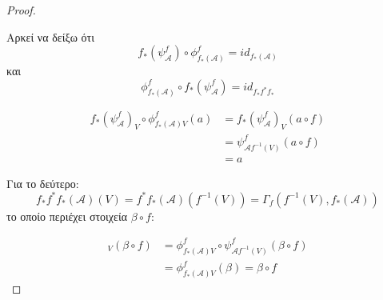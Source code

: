 \begin{proof}

    \begin{figure}[H]
        \centering
    \end{figure}
    \noindent Αρκεί να δείξω ότι $$f_*(\psi^f_{\mathcal{A}}) \circ \phi^f_{f_*(\mathcal{A})} = id_{f_*(\mathcal{A})}$$ και 
    $$\phi^f_{f_*(\mathcal{A})} \circ f_*(\psi^f_{\mathcal{A}}) = id_{f_*f^*f_*}$$


    \begin{align*}
        f_*(\psi^f_{\mathcal{A}})_V \circ \phi^f_{f_*(\mathcal{A})V}(a) & =  f_*(\psi^f_{\mathcal{A}})_V (a\circ f) \\
        &= \psi^f_{\mathcal{A}f^{-1}(V)}(a\circ f) \\
        &= a 
    \end{align*}

    \noindent Για το δεύτερο:
    $$f_*f^*f_*(\mathcal{A})(V) = f^*f_*(\mathcal{A})(f^{-1}(V)) = \Gamma_f(f^{-1}(V),f_*(\mathcal{A}))$$ το οποίο περιέχει στοιχεία $\beta \circ f$:

    \begin{align*}
        [\phi^f_{f_*(\mathcal{A})} \circ f_*(\psi^f_{\mathcal{A}})]_V (\beta\circ f) & = \phi^f_{f_*(\mathcal{A})V} \circ \psi^f_{\mathcal{A}f^{-1}(V)} (\beta \circ f) \\
        & = \phi^f_{f_*(\mathcal{A})V} (\beta) = \beta \circ f
    \end{align*}
\end{proof}

